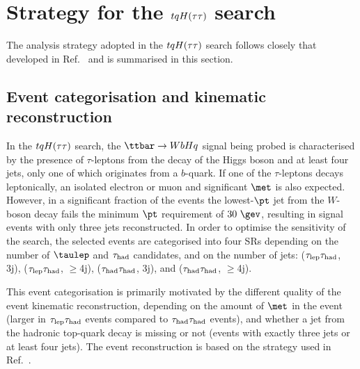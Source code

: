 \section{Strategy for the $tqH(\tau\tau)$ search}
\label{sec:strategy_Htautau}

The analysis strategy adopted in the $tqH(\tau\tau)$ search follows closely that developed in Ref.~\cite{Chen:2015nta} and is summarised in this section.

\subsection{Event categorisation and kinematic reconstruction}
\label{sec:htautau_reco_cat}

In the $tqH(\tau\tau)$ search, the $\ttbar \to WbHq$ signal being probed is characterised by the presence of $\tau$-leptons from the decay of 
the Higgs boson and at least four jets, only one of which originates from a $b$-quark.
If one of the $\tau$-leptons decays leptonically, an isolated electron or muon and significant $\met$ is also expected.
However, in a significant fraction of the events the lowest-$\pt$ jet from the $W$-boson decay fails the minimum $\pt$ requirement of $30~\gev$,
resulting in signal events with only three jets reconstructed.
In order to optimise the sensitivity of the search, the selected events are categorised into four SRs depending 
on the number of $\taulep$ and $\tau_{\mathrm{had}}$ candidates, and on the number of jets:
($\tau_{\mathrm{lep}} \tau_{\mathrm{had}}$, 3j), ($\tau_{\mathrm{lep}} \tau_{\mathrm{had}}$, $\geq$4j), ($\tau_{\mathrm{had}} \tau_{\mathrm{had}}$, 3j), and ($\tau_{\mathrm{had}} \tau_{\mathrm{had}}$, $\geq$4j). 

This event categorisation is primarily motivated by the different quality of the event kinematic reconstruction, depending on the amount 
of $\met$ in the event (larger in $\tau_{\mathrm{lep}} \tau_{\mathrm{had}}$ events compared to $\tau_{\mathrm{had}} \tau_{\mathrm{had}}$ events), and whether a jet from the hadronic top-quark decay 
is missing or not (events with exactly three jets or at least four jets).
The event reconstruction is based on the strategy used in Ref.~\cite{Chen:2015nta}.

